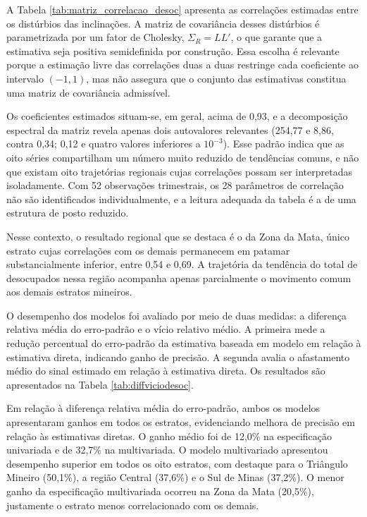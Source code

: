 \documentclass[rbe,wwwview]{econbr}
\begin{document}
A Tabela \ref{tab:matriz_correlacao_desoc} apresenta as correlações estimadas entre os distúrbios das inclinações. A matriz de covariância desses distúrbios é parametrizada por um fator de Cholesky, \(\Sigma_R = LL'\), o que garante que a estimativa seja positiva semidefinida por construção. Essa escolha é relevante porque a estimação livre das correlações duas a duas restringe cada coeficiente ao intervalo \((-1,1)\), mas não assegura que o conjunto das estimativas constitua uma matriz de covariância admissível.

Os coeficientes estimados situam-se, em geral, acima de 0,93, e a decomposição espectral da matriz revela apenas dois autovalores relevantes (254,77 e 8,86, contra 0,34; 0,12 e quatro valores inferiores a \(10^{-3}\)). Esse padrão indica que as oito séries compartilham um número muito reduzido de tendências comuns, e não que existam oito trajetórias regionais cujas correlações possam ser interpretadas isoladamente. Com 52 observações trimestrais, os 28 parâmetros de correlação não são identificados individualmente, e a leitura adequada da tabela é a de uma estrutura de posto reduzido.

Nesse contexto, o resultado regional que se destaca é o da Zona da Mata, único estrato cujas correlações com os demais permanecem em patamar substancialmente inferior, entre 0,54 e 0,69. A trajetória da tendência do total de desocupados nessa região acompanha apenas parcialmente o movimento comum aos demais estratos mineiros.

\vspace{-0.3cm}

\vspace{-0.4cm}

O desempenho dos modelos foi avaliado por meio de duas medidas: a diferença relativa média do erro-padrão e o vício relativo médio. A primeira mede a redução percentual do erro-padrão da estimativa baseada em modelo em relação à estimativa direta, indicando ganho de precisão. A segunda avalia o afastamento médio do sinal estimado em relação à estimativa direta. Os resultados são apresentados na Tabela \ref{tab:diffviciodesoc}.

\vspace{-0.3cm}

\vspace{-0.4cm}

Em relação à diferença relativa média do erro-padrão, ambos os modelos apresentaram ganhos em todos os estratos, evidenciando melhora de precisão em relação às estimativas diretas. O ganho médio foi de 12,0\% na especificação univariada e de 32,7\% na multivariada. O modelo multivariado apresentou desempenho superior em todos os oito estratos, com destaque para o Triângulo Mineiro (50,1\%), a região Central (37,6\%) e o Sul de Minas (37,2\%). O menor ganho da especificação multivariada ocorreu na Zona da Mata (20,5\%), justamente o estrato menos correlacionado com os demais.
\end{document}
